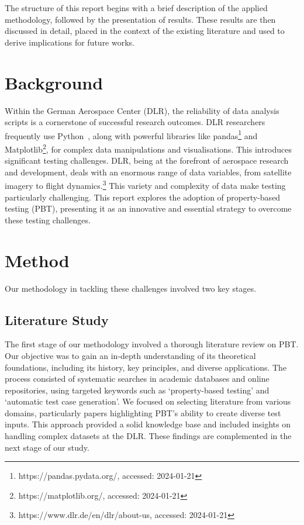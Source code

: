\documentclass[runningheads]{llncs}
\begin{document}
The structure of this report begins with a brief description of the applied methodology, followed by the presentation of results. These results are then discussed in detail, placed in the context of the existing literature and used to derive implications for future works.

\section{Background}
Within the German Aerospace Center (DLR), the reliability of data analysis scripts is a cornerstone of successful research outcomes. DLR researchers frequently use Python~\cite{Kurnatowski2020}, along with powerful libraries like pandas\footnote{https://pandas.pydata.org/, accessed: 2024-01-21} and Matplotlib\footnote{https://matplotlib.org/, accessed: 2024-01-21}, for complex data manipulations and visualisations. This introduces significant testing challenges. DLR, being at the forefront of aerospace research and development, deals with an enormous range of data variables, from satellite imagery to flight dynamics.\footnote{https://www.dlr.de/en/dlr/about-us, accessed: 2024-01-21} This variety and complexity of data make testing particularly challenging. This report explores the adoption of property-based testing (PBT), presenting it as an innovative and essential strategy to overcome these testing challenges.

\section{Method}
Our methodology in tackling these challenges involved two key stages.

\subsection{Literature Study}
The first stage of our methodology involved a thorough literature review on PBT. Our objective was to gain an in-depth understanding of its theoretical foundations, including its history, key principles, and diverse applications. The process consisted of systematic searches in academic databases and online repositories, using targeted keywords such as `property-based testing' and `automatic test case generation'. We focused on selecting literature from various domains, particularly papers highlighting PBT's ability to create diverse test inputs. This approach provided a solid knowledge base and included insights on handling complex datasets at the DLR. These findings are complemented in the next stage of our study.
\end{document}
